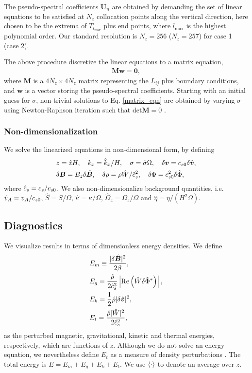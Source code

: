 The pseudo-spectral coefficients $\bm{U}_n$  are obtained by demanding
the set of linear equations to be satisfied at $N_z$ collocation
points along the vertical direction, here chosen to be the 
extrema of $T_{l_\mathrm{max}}$ plus end points, where 
$l_\mathrm{max}$ is the highest polynomial order. Our standard
resolution is $N_z=256$ ($N_z=257$) for case 1 (case 2).   

The above procedure discretize the linear equations to a matrix equation,
\begin{align}\label{matrix_eqn}
\bm{M}\bm{w} = \mathbf{0}, 
\end{align}
where $\bm{M}$ is a $4N_z\times 4 N_z$ matrix representing the $L_{ij}$ 
plus boundary conditions, 
and $\bm{w}$ is a vector storing the pseudo-spectral coefficients. 
Starting with an initial guess for $\sigma$, non-trivial solutions to
Eq. \ref{matrix_eqn} are obtained by varying $\sigma$ using Newton-Raphson iteration 
such that $\mathrm{det}\bm{M}=0$ \citep[details can be found in][]{lin12}.


\subsubsection{Non-dimensionalization}\label{non-dim}
We solve the linearized equations in non-dimensional form,
by defining
\begin{align}
  &z=\hat{z}H,\quad k_x =  \hat{k}_x/H,\quad \sigma = \hat{\sigma}\Omega,
  \quad \delta\bm{v} = c_{s0} 
  \delta\hat{\bm{v}}, \\ 
  &\delta\bm{B} = B_z\delta\hat{\bm{B}},\quad
  \delta\rho = \rho\hat{W}/\hat{c}_s^2,\quad \delta\Phi =
  c_{s0}^2\delta\hat{\Phi},  
\end{align} 
where $\hat{c}_s=c_s/c_{s0}$. We also non-dimensionalize 
background quantities, i.e. $\hat{v}_A=v_A/c_{s0}$,
$\hat{S}=S/\Omega$, $\hat{\kappa}=\kappa/\Omega$,
$\hat{\Omega}_z=\Omega_z/\Omega$ and $\hat{\eta} = \eta/(H^2\Omega)$. 


\subsection{Diagnostics}
We visualize results in terms of dimensionless energy densities. We
define 
\begin{align}
  &E_m \equiv \frac{|\delta \hat{\bm{B}}|^2}{2\beta},\\
  &E_g = 
  \frac{\hat{\rho}}{2\hat{c}_s^2}\left|\operatorname{Re}\left(\hat{W}\delta\hat{\Phi}^*\right)\right|,\\  
  &E_k = \frac{1}{2}\hat{\rho}|\delta\hat{\bm{v}}|^2,\\
  &E_t = \frac{\hat{\rho}|\hat{W}|^2}{2\hat{c}_s^2},
\end{align}
as the perturbed magnetic, gravitational, kinetic and thermal
energies, respectively, which are functions of $z$. Although we do not
solve an energy equation, we nevertheless define $E_t$ as a measure of
density perturbations \citep{kojima89}. The total energy
is $E=E_m+E_g+E_k+E_t$. We use $\langle{\cdot}\rangle$ to denote an average over
$z$. 

